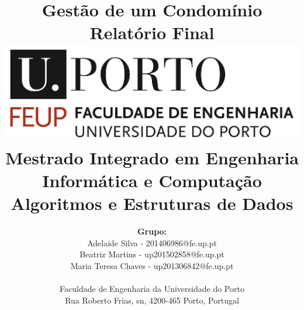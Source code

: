 \documentclass[a4paper]{article}
\begin{document}
\setlength{\textwidth}{16cm}
\setlength{\textheight}{22cm}

\title{\Huge\textbf{Gestão de um Condomínio}\linebreak\linebreak\linebreak
\Large\textbf{Relatório Final}\linebreak\linebreak
\linebreak\linebreak
\includegraphics[scale=0.1]{feup-logo.png}\linebreak\linebreak
\linebreak\linebreak
\Large{Mestrado Integrado em Engenharia Informática e Computação} \linebreak\linebreak
\Large{Algoritmos e Estruturas de Dados}\linebreak
}

\author{\textbf{Grupo:}\\
Adelaide Silva - 201406986@fe.up.pt \\
Beatriz Martins - up201502858@fe.up.pt \\
Maria Teresa Chaves - up201306842@fe.up.pt
\linebreak\linebreak \\
 \\ Faculdade de Engenharia da Universidade do Porto \\ Rua Roberto Frias, s\/n, 4200-465 Porto, Portugal \linebreak\linebreak\linebreak
\linebreak\linebreak\vspace{1cm}}

\maketitle
\thispagestyle{empty}
\end{document}
